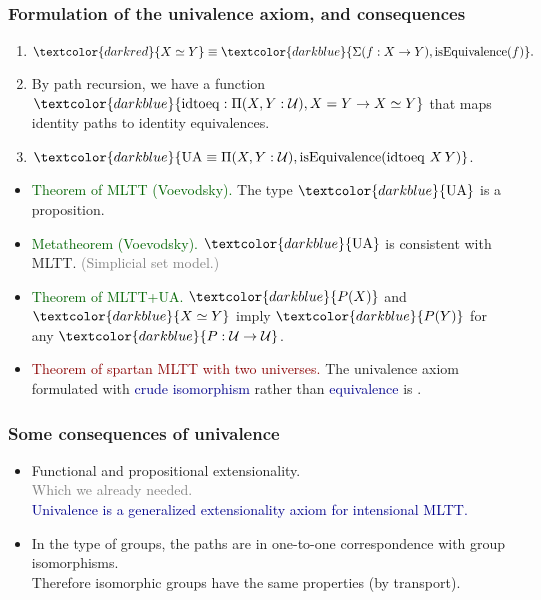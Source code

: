 \documentclass[aspectratio=169]{beamer}
\newcommand{\UA}{\operatorname{UA}}
\newcommand{\isEquivalence}{\operatorname{isEquivalence}}
\newcommand{\idtoeq}{\operatorname{idtoeq}}
\newcommand{\eqq}{\equiv}
\newcommand{\U}{\operatorname{\mathcal{U}}}
\newcommand{\db}{\textcolor{darkblue}}
\newcommand{\dg}{\textcolor{darkgreen}}
\newcommand{\grey}{\textcolor{grey}}
\newcommand{\dr}{\textcolor{darkred}}
\newcommand{\m}[1]{$\db{#1}$}
\begin{document}
\begin{frame}
  \frametitle{Formulation of the univalence axiom, and consequences}

\begin{enumerate}
\vfill \item $\dr{X \simeq Y} \eqq \db{\Sigma(f:X \to Y), \isEquivalence(f)}.$
\vfill \item By path recursion, we have a function \m{\idtoeq : \Pi(X,Y:\U), X = Y \to X \simeq Y} that maps identity paths to identity equivalences.
\vfill \item \m{\UA \eqq \Pi(X,Y:\U), \isEquivalence(\idtoeq \, X \, Y)}.
\end{enumerate}

\begin{itemize}
\vfill \item 
\dg{Theorem of MLTT (Voevodsky).} The type \m{\UA} is a proposition.

\vfill \item
\dg{Metatheorem (Voevodsky).} \m{\UA} is consistent with MLTT. \grey{(Simplicial set model.)}

\vfill \item
\dg{Theorem of MLTT+UA.} \m{P(X)} and \m{X \simeq Y} imply \m{P(Y)} for any \m{P : \U \to \U}.

\vfill \item
\dr{Theorem of spartan MLTT with two universes.} The univalence axiom formulated with \db{crude isomorphism} rather than \db{equivalence} is \framebox{\dr{false}}.
\end{itemize}

\end{frame}

\begin{frame}
  \frametitle{Some consequences of univalence}

  \begin{itemize}
  \vfill \item Functional and propositional extensionality. \\[1ex]
  \grey{Which we already needed.} \\[1ex]
  \db{Univalence is a generalized extensionality axiom for intensional MLTT.}
  \vfill \item In the type of groups, the paths are in one-to-one correspondence with group isomorphisms. \\[1ex]
  Therefore isomorphic groups have the same properties (by transport).
  \end{itemize}

\end{frame}
\end{document}
